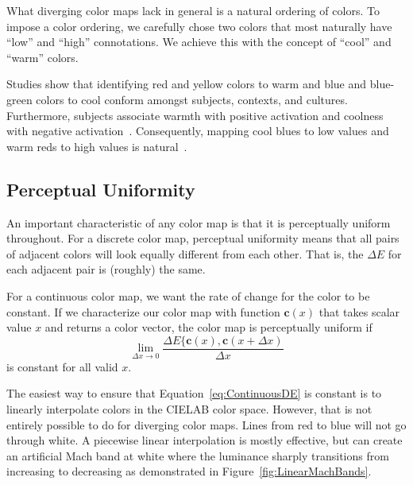 \documentclass{vgtc}                          %
\newcommand{\lcite}[1]{~\cite{#1}}
\newcommand{\Lab}{CIELAB\xspace}
\newcommand{\DeltaE}{\ensuremath{\Delta{}E}\xspace}
\newcommand*{\cvec}[1]{\mathbf{#1}}
\begin{document}
What diverging color maps lack in general is a natural ordering of colors.
To impose a color ordering, we carefully chose two colors that most
naturally have ``low'' and ``high'' connotations.  We achieve this with the
concept of ``cool'' and ``warm'' colors.

Studies show that identifying red and yellow colors to warm and blue and
blue-green colors to cool conform amongst subjects, contexts, and
cultures.  Furthermore, subjects associate warmth with positive activation
and coolness with negative activation\lcite{Hardin97}.  Consequently,
mapping cool blues to low values and warm reds to high values is
natural\lcite{Fortner97}.


\subsection{Perceptual Uniformity}
\label{sec:PerceptualUniformity}

An important characteristic of any color map is that it is perceptually
uniform throughout.  For a discrete color map, perceptual uniformity means
that all pairs of adjacent colors will look equally different from each
other.  That is, the \DeltaE for each adjacent pair is (roughly) the same.

For a continuous color map, we want the rate of change for the color to be
constant.  If we characterize our color map with function $\cvec{c}(x)$
that takes scalar value $x$ and returns a color vector, the color map is
perceptually uniform if
\begin{equation}
  \lim_{\Delta{}x \rightarrow 0}{
    \frac{\DeltaE\{\cvec{c}(x),\cvec{c}(x+\Delta{x})}{\Delta{}x} }
  \label{eq:ContinuousDE}
\end{equation}
is constant for all valid $x$.

The easiest way to ensure that Equation~\ref{eq:ContinuousDE} is constant
is to linearly interpolate colors in the \Lab color space.  However, that
is not entirely possible to do for diverging color maps.  Lines from red to
blue will not go through white.  A piecewise linear interpolation is mostly
effective, but can create an artificial Mach band at white where the
luminance sharply transitions from increasing to decreasing as demonstrated
in Figure~\ref{fig:LinearMachBands}.
\end{document}
